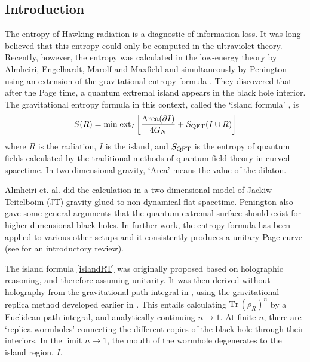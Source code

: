 \documentclass[12pt]{article}
\newcommand{\f}{\frac}
\newcommand{\be}{\begin{equation}}
\newcommand{\ee}{\end{equation}}
\def\be{\begin{eqnarray}}
\def\ee{\end{eqnarray}}
\newcommand{\tr}{\textrm{Tr}\,}
\let\f=\frac
\def\be{\begin{equation}}
\def\ee{\end{equation}}
\numberwithin{equation}{section}
\def\pp{\partial}
\def\be{\begin{equation}}
\def\ee{\end{equation}}
\def\f {\frac}
\def \be {\begin{equation}}
\def \ee {\end{equation}}
\newcommand{\ext}{\mbox{ext}}
\newcommand{\Ssemi}{S_{\rm QFT}}
\renewcommand{\min}{{\rm min}}
\begin{document}
\tableofcontents

\newpage
\begin{spacing}{1.1}

\section{Introduction}

The entropy of Hawking radiation is a diagnostic of information loss. It was long believed that this entropy could only be computed in the ultraviolet theory. Recently, however, the entropy was calculated in the low-energy theory by Almheiri, Engelhardt, Marolf and Maxfield \cite{Almheiri:2019psf} and simultaneously by Penington \cite{Penington:2019npb} using an extension of the gravitational entropy formula \cite{Penington:2019npb,Almheiri:2019psf, Ryu:2006bv, Hubeny:2007xt, Lewkowycz:2013nqa, Barrella:2013wja, Faulkner:2013ana, Engelhardt:2014gca}. They discovered that after the Page time, a quantum extremal island appears in the black hole interior. The gravitational entropy formula in this context, called the `island formula' \cite{Almheiri:2019hni}, is
\be\label{islandRT}
S(R) = \min \; \ext_I \left[ \f{\mbox{Area}(\pp{I})}{4G_N}+\Ssemi(I\cup R)  \right]
\ee
where $R$ is the radiation, $I$ is the island, and $\Ssemi$ is the entropy of quantum fields calculated by the traditional methods of quantum field theory in curved spacetime. In two-dimensional gravity, `Area' means the value of the dilaton. 

Almheiri et. al. \cite{Almheiri:2019psf} did the calculation in a two-dimensional model of Jackiw-Teitelboim (JT) gravity \cite{JACKIW1985343,TEITELBOIM198341} glued to non-dynamical flat spacetime. Penington \cite{Penington:2019npb} also gave some general arguments that the quantum extremal surface should exist for higher-dimensional black holes. In further work, the entropy formula has  been applied to various other setups and it consistently produces a unitary Page curve \cite{Almheiri:2019hni, Almheiri:2019yqk, Almheiri:2019qdq, Penington:2019kki, Hartman:2020swn, Hartman:2020khs,Chen:2020tes,Chen:2020uac,Chen:2020jvn,Chen:2020hmv ,Balasubramanian:2020xqf,Hollowood:2020cou,Hollowood:2020kvk,Geng:2020qvw,Alishahiha:2020qza,Hashimoto:2020cas,Anegawa:2020ezn,Gautason:2020tmk } (see \cite{Almheiri:2020cfm} for an introductory review).

The island formula \eqref{islandRT} was originally proposed based on holographic reasoning, and therefore assuming unitarity. It was then derived without holography from the gravitational path integral in \cite{Almheiri:2019qdq,Penington:2019kki}, using the gravitational replica method  developed earlier in \cite{Lewkowycz:2013nqa, Dong:2016hjy}. This entails calculating $\tr (\rho_R)^n$ by a Euclidean path integral, and analytically continuing $n\to 1$. At finite $n$, there are `replica wormholes' connecting the different copies of the black hole through their interiors. In the limit $n \to 1$, the mouth of the wormhole degenerates to the island region, $I$.  



\end{spacing}
\end{document}
